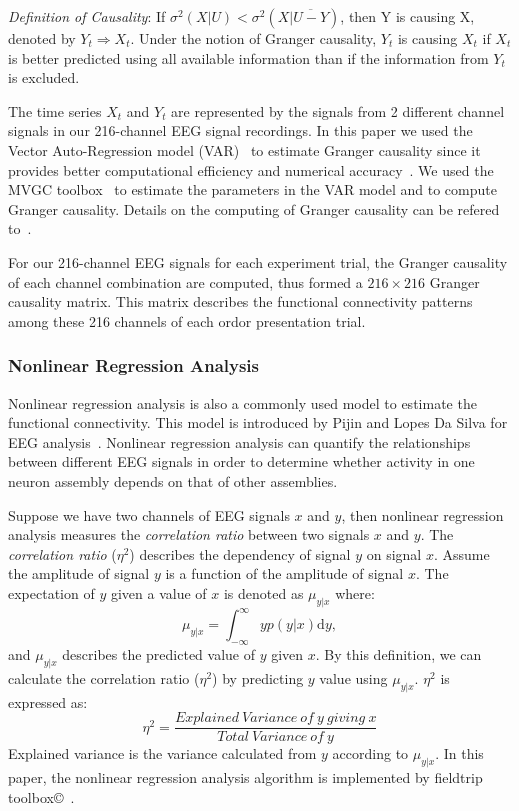 \emph{Definition of Causality}: If $\sigma^2(X|U)<\sigma^2(X|\overline{U-Y})$, then Y is causing X, denoted by $Y_t \Rightarrow X_t$. Under the notion of Granger causality, $Y_t$ is causing $X_t$ if $X_t$ is better predicted using all available information than if the information from $Y_t$ is excluded.

The time series $X_t$ and $Y_t$ are represented by the signals from 2 different channel signals in our 216-channel EEG signal recordings. In this paper we used the Vector Auto-Regression model (VAR)~\cite{barnett2014mvgc} to estimate Granger causality since it provides better computational efficiency and numerical accuracy~\cite{barnett2014mvgc}. We used the MVGC toolbox~\cite{barnett2014mvgc} to estimate the parameters in the VAR model and to compute Granger causality. Details on the computing of Granger causality can be refered to~\cite{barnett2014mvgc}.

For our 216-channel EEG signals for each experiment trial, the Granger causality of each channel combination are computed, thus formed a $216 \times 216$ Granger causality matrix. This matrix describes the functional connectivity patterns among these 216 channels of each ordor presentation trial. 

\subsubsection{Nonlinear Regression Analysis}
Nonlinear regression analysis is also a commonly used model to estimate the functional connectivity. This model is introduced by Pijin and Lopes Da Silva for EEG analysis~\cite{pijn1990localization}. Nonlinear regression analysis can quantify the relationships between different EEG signals in order to determine whether activity in one neuron assembly depends on that of other assemblies.


Suppose we have two channels of EEG signals $x$ and $y$, then nonlinear regression analysis measures the \emph{correlation ratio} between two signals $x$ and $y$. The \emph{correlation ratio} ($\eta^2$) describes the dependency of signal $y$ on signal $x$. Assume the amplitude of signal $y$ is a function of the amplitude of signal $x$. The expectation of $y$ given a value of $x$ is denoted as $\mu_{y|x}$ where:
\begin{equation} \label{eq:regressioncurve}
\mu_{y|x} = \int_{-\infty}^{\infty} y p(y|x) \mathrm{d}y,
\end{equation}
and $\mu_{y|x}$ describes the predicted value of $y$ given $x$. By this definition, we can calculate the correlation ratio ($\eta^2$) by predicting $y$ value using $\mu_{y|x}$. $\eta^2$ is expressed as:
\begin{equation} \label{eq:NRAregression}
\eta^2 = \frac{Explained \ Variance \ of \ y \ giving \ x }{Total \ Variance \ of \ y}
\end{equation}
Explained variance is the variance calculated from $y$ according to $\mu_{y|x}$. In this paper, the nonlinear regression analysis algorithm is implemented by fieldtrip toolbox\copyright~\cite{oostenveld2010fieldtrip}. 


